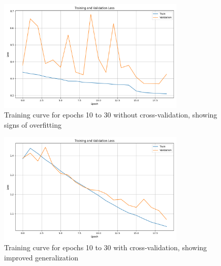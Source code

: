 \documentclass[]{article}
\begin{document}
\begin{figure}[htbp]
		\centering
		\includegraphics[width=0.8\textwidth]{figures/no_cross_val_10_30.png}
		\caption{Training curve for epochs 10 to 30 without cross-validation, showing signs of overfitting}
		\label{fig:no_cross_val_10_30}
\end{figure}

\begin{figure}[htbp]
		\centering
		\includegraphics[width=0.8\textwidth]{figures/cross_10_30.png}
		\caption{Training curve for epochs 10 to 30 with cross-validation, showing improved generalization}
		\label{fig:cross_val_10_30}
\end{figure}
\end{document}
